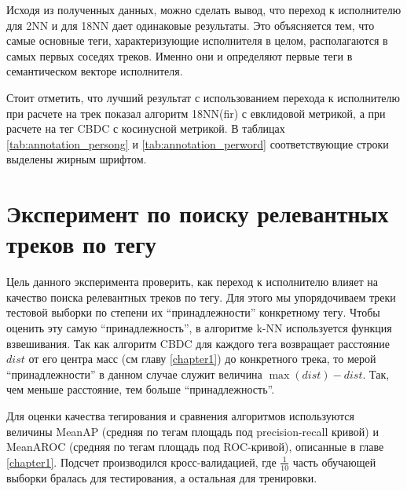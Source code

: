 Исходя из полученных данных, можно сделать вывод, что переход к исполнителю для 2NN и для 18NN дает одинаковые результаты. Это объясняется тем, что самые основные теги, характеризующие исполнителя в целом, 
располагаются в самых первых соседях треков. Именно они и определяют первые теги в семантическом векторе исполнителя.

Стоит отметить, что лучший результат с использованием перехода к исполнителю при расчете на трек показал алгоритм 18NN(fir) с евклидовой метрикой, а при расчете на тег \ld CBDC с косинусной метрикой.
В таблицах \ref{tab:annotation_persong} и \ref{tab:annotation_perword} соответствующие строки выделены жирным шрифтом.

\section{Эксперимент по поиску релевантных треков по тегу}

Цель данного эксперимента \ld проверить, как переход к исполнителю влияет на качество поиска релевантных треков по тегу.
Для этого мы упорядочиваем треки тестовой выборки по степени их ``принадлежности'' конкретному тегу. Чтобы оценить эту самую ``принадлежность'', в алгоритме k-NN используется функция взвешивания.
Так как алгоритм CBDC для каждого тега возвращает расстояние $dist$ от его центра масс (см главу \ref{chapter1}) до конкретного трека, то мерой ``принадлежности'' в данном случае служит величина
$\max(dist) - dist$. Так, чем меньше расстояние, тем больше ``принадлежность''.

Для оценки качества тегирования и сравнения алгоритмов используются величины MeanAP (средняя по тегам площадь под precision-recall кривой) и MeanAROC (средняя по тегам площадь под ROC-кривой),
описанные в главе \ref{chapter1}. Подсчет производился кросс-валидацией, где $\frac{1}{10}$ часть обучающей выборки бралась для тестирования, а остальная \ld для тренировки.


